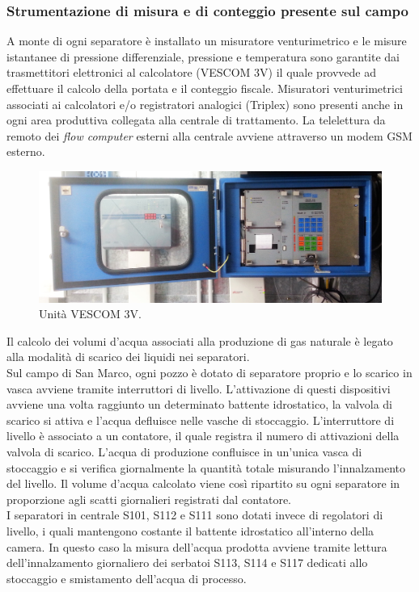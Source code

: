 \subsubsection*{Strumentazione di misura e di conteggio presente sul campo}
A monte di ogni separatore è installato un misuratore venturimetrico e le misure istantanee di pressione differenziale, pressione e temperatura sono garantite dai trasmettitori elettronici al calcolatore (VESCOM 3V) il quale provvede ad effettuare il calcolo della portata e il conteggio fiscale. Misuratori venturimetrici associati ai calcolatori e/o registratori analogici (Triplex) sono presenti anche in ogni area produttiva collegata alla centrale di trattamento. La telelettura da remoto dei \textit{flow computer} esterni alla centrale avviene attraverso un modem GSM esterno.
\begin{figure}[htbp]
    \centering
    \includegraphics[width=\textwidth]{fig/test/vescom}  
	\caption{Unità VESCOM 3V.}
	\label{fig:vescom}
\end{figure}
Il calcolo dei volumi d'acqua associati alla produzione di gas naturale è legato alla modalità di scarico dei liquidi nei separatori.\\
Sul campo di San Marco, ogni pozzo è dotato di separatore proprio e lo scarico in vasca avviene tramite interruttori di livello. L'attivazione di questi dispositivi avviene una volta raggiunto un determinato battente idrostatico, la valvola di scarico si attiva e l'acqua defluisce nelle vasche di stoccaggio. L'interruttore di livello è associato a un contatore, il quale registra il numero di attivazioni della valvola di scarico. L'acqua di produzione confluisce in un'unica vasca di stoccaggio e si verifica giornalmente la quantità totale misurando l'innalzamento del livello. Il volume d'acqua calcolato viene così ripartito su ogni separatore in proporzione agli scatti giornalieri registrati dal contatore.\\
I separatori in centrale S101, S112 e S111 sono dotati invece di regolatori di livello, i quali mantengono costante il battente idrostatico all'interno della camera. In questo caso la misura dell'acqua prodotta avviene tramite lettura dell'innalzamento giornaliero dei serbatoi S113, S114 e S117 dedicati allo stoccaggio e smistamento dell'acqua di processo.

